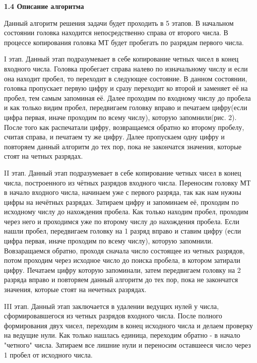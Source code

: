 \documentclass{article}
\begin{document}
\par\textbf{1.4 Описание алгоритма}\\
\par Данный алгоритм решения задачи будет проходить в 5 этапов. В начальном состоянии головка находится непосредственно справа от второго числа. В процессе копирования головка МТ будет пробегать по разрядам первого числа.\\
\vspace{-0.2cm}

\par I этап. Данный этап подразумевает в себе копирование четных чисел в конец входного числа. Головка пробегает справа налево по изначальному числу и если она находит пробел, то переходит в следующее состояние. В данном состоянии, головка пропускает первую цифру и сразу переходит ко второй и заменяет её на пробел, тем самым запоминая её. Далее проходим по входному числу до пробела и как только видим пробел, передвигаем головку вправо и печатаем цифру(если цифра первая, иначе проходим по всему числу), которую запомнили(рис. 2). После того как распечатали цифру, возвращаемся обратно ко второму пробелу, считая справа, и печатаем ту же цифру. Далее пропускаем одну цифру и повторяем данный алгоритм до тех пор, пока не закончатся значения, которые стоят на четных разрядах.\\

\vspace{-0.2cm}
\par II этап. Данный этап подразумевает в себе копирование четных чисел в конец числа, построенного из чётных разрядов входного числа. Переносим головку МТ в начало входного числа, начинаем уже с первого разряда, так как нам нужны цифры на нечётных разрядах. Затираем цифру и запоминаем её, проходим по исходному числу до нахождения пробела. Как только находим пробел, проходим через него и проходимся уже по второму числу до нахождения пробела. Если нашли пробел, передвигаем головку на 1 разряд вправо и ставим цифру (если цифра первая, иначе проходим по всему числу), которую запомнили. Вовзаращаемся обратно, проходя сначала число состоящее из четных разрядов, потом проходим через исходное число до поиска пробела, в котором затирали цифру. Печатаем цифру которую запоминали, затем передвигаем головку на 2 разряда вправо и повторяем данный алгоритм до тех пор, пока не закончатся значения, которые стоят на нечетных разрядах.\\

\vspace{-0.2cm}
\par III этап. Данный этап заключается в удалении ведущих нулей у числа, сформировавшегося из четных разрядов входного числа. После полного формирования двух чисел, переходим в конец исходного числа и делаем проверку на ведущие нули. Как только нашлась единица, переходим обратно - в начало "четного" числа. Затираем все лишние нули и переносим оставшееся число через 1 пробел от исходного числа. \\
\end{document}
